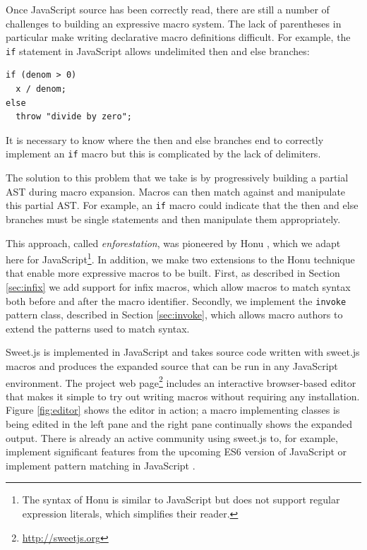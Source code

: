 \documentclass[preprint,10pt]{sigplanconf}
\begin{document}
Once JavaScript source has been correctly read, there are still a
number of challenges to building an expressive macro system. The lack
of parentheses in particular make writing declarative macro
definitions difficult. For example, the \verb!if! statement in
JavaScript allows undelimited then and else branches:
\begin{lstlisting}
if (denom > 0)
  x / denom;
else
  throw "divide by zero";
\end{lstlisting}
It is necessary to know where the then and else branches end to
correctly implement an \verb!if! macro but this is complicated by
the lack of delimiters. 

The solution to this problem that we take is by progressively building
a partial AST during macro expansion. Macros can then match against
and manipulate this partial AST. For example, an \verb!if! macro
could indicate that the then and else branches must be single
statements and then manipulate them appropriately.


This approach, called \emph{enforestation}, was pioneered by Honu
\cite{Rafkind2012,Rafkind2013}, which we adapt here for
JavaScript\footnote{The syntax of Honu is similar to JavaScript but does
  not support regular expression literals, which simplifies their
  reader. }. In addition, we make two extensions to the Honu technique
that enable more expressive macros to be built. First, as described in
Section \ref{sec:infix} we add support for infix macros, which allow
macros to match syntax both before and after the macro identifier.
Secondly, we implement the \verb!invoke! pattern class, described in
Section \ref{sec:invoke}, which allows macro authors to extend the
patterns used to match syntax.

Sweet.js is implemented in JavaScript and takes source code written with sweet.js macros and produces the expanded source that can be run in any JavaScript environment. 
The project web page\footnote{\url{http://sweetjs.org}} includes an interactive browser-based editor that makes it simple to try out writing macros without requiring any installation.
Figure \ref{fig:editor} shows the editor in action; a macro implementing classes is being edited in the left pane and the right pane continually shows the expanded output.
There is already an active community using sweet.js to, for example, implement
significant features from the upcoming ES6 version of JavaScript \cite{Long} or implement pattern matching in JavaScript \cite{Faubion}.

\end{document}

